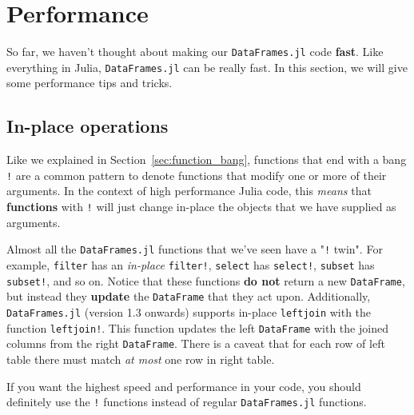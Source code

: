 \documentclass[
  notoc %
]{tufte-book}
\newcommand{\passthrough}[1]{#1}
\begin{document}
\hypertarget{sec:df_performance}{%
\section{Performance}\label{sec:df_performance}}

So far, we haven't thought about making our
\passthrough{\lstinline!DataFrames.jl!} code \textbf{fast}. Like
everything in Julia, \passthrough{\lstinline!DataFrames.jl!} can be
really fast. In this section, we will give some performance tips and
tricks.

\hypertarget{sec:df_performance_inplace}{%
\subsection{In-place operations}\label{sec:df_performance_inplace}}

Like we explained in Section~\ref{sec:function_bang}, functions that end
with a bang \passthrough{\lstinline"!"} are a common pattern to denote
functions that modify one or more of their arguments. In the context of
high performance Julia code, this \emph{means} that \textbf{functions}
with \passthrough{\lstinline"!"} will just change in-place the objects
that we have supplied as arguments.

Almost all the \passthrough{\lstinline!DataFrames.jl!} functions that
we've seen have a "\passthrough{\lstinline"!"} twin". For example,
\passthrough{\lstinline!filter!} has an \emph{in-place}
\passthrough{\lstinline"filter!"}, \passthrough{\lstinline!select!} has
\passthrough{\lstinline"select!"}, \passthrough{\lstinline!subset!} has
\passthrough{\lstinline"subset!"}, and so on. Notice that these
functions \textbf{do not} return a new
\passthrough{\lstinline!DataFrame!}, but instead they \textbf{update}
the \passthrough{\lstinline!DataFrame!} that they act upon.
Additionally, \passthrough{\lstinline!DataFrames.jl!} (version 1.3
onwards) supports in-place \passthrough{\lstinline!leftjoin!} with the
function \passthrough{\lstinline"leftjoin!"}. This function updates the
left \passthrough{\lstinline!DataFrame!} with the joined columns from
the right \passthrough{\lstinline!DataFrame!}. There is a caveat that
for each row of left table there must match \emph{at most} one row in
right table.

If you want the highest speed and performance in your code, you should
definitely use the \passthrough{\lstinline"!"} functions instead of
regular \passthrough{\lstinline!DataFrames.jl!} functions.
\end{document}

